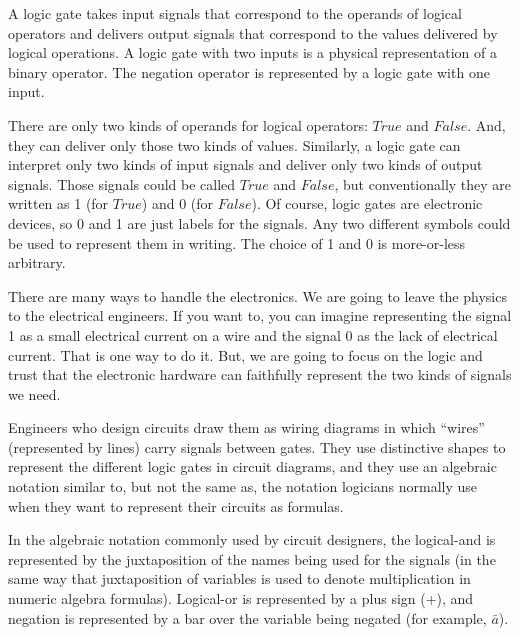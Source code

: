 A logic gate takes input signals that correspond
to the operands of logical operators and delivers output signals
that correspond to the values delivered by logical operations.
A logic gate with two inputs is a physical representation of
a binary operator. The negation operator is represented by a
logic gate with one input.

There are only two kinds of operands for logical operators: $True$ and $False$.
And, they can deliver only those two kinds of values.
Similarly, a logic gate can interpret only two kinds of input signals
and deliver only two kinds of output signals.
Those signals could be called $True$ and $False$,
but conventionally they are written as 1 (for $True$) and 0 (for $False$).
Of course, logic gates are electronic devices,
so 0 and 1 are just labels for the signals.
Any two different symbols could be used to represent them in writing.
The choice of 1 and 0 is more-or-less arbitrary.

There are many ways to handle the electronics.
We are going to leave the physics to the electrical engineers.
If you want to, you can imagine representing the signal 1 as
a small electrical current on a wire and the signal 0 as
the lack of electrical current.
That is one way to do it.
But, we are going to focus on the logic and trust that
the electronic hardware can faithfully represent the two
kinds of signals we need.

Engineers who design circuits draw them as wiring diagrams
in which ``wires'' (represented by lines) carry signals between gates.
They use distinctive shapes to represent the different logic gates in
circuit diagrams,
and they use an algebraic notation similar to, but
not the same as, the notation logicians normally use when they want
to represent their circuits as formulas.

In the algebraic notation commonly used by circuit
designers, the logical-and is represented by the juxtaposition
of the names being used for the signals (in the same way
that juxtaposition of variables is used to denote multiplication
in numeric algebra formulas). Logical-or is represented by a plus sign (+),
and negation is represented by a bar over the variable being negated
(for example, $\bar{a}$).

